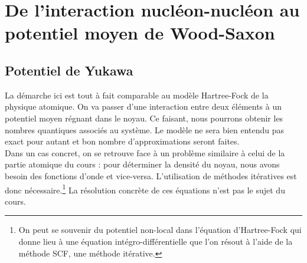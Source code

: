 \section{De l'interaction nucléon-nucléon au potentiel moyen de Wood-Saxon}
\subsection{Potentiel de Yukawa}


La démarche ici est tout à fait comparable au modèle Hartree-Fock de la physique atomique. On va passer d'une interaction entre deux éléments à un potentiel moyen régnant dans le noyau. Ce faisant, nous pourrons obtenir les nombres quantiques associés au système. Le modèle ne sera bien entendu pas exact pour autant et bon nombre d'approximations seront faites.\\

Dans un cas concret, on se retrouve face à un problème similaire à celui de la partie atomique du cours : pour déterminer la densité du noyau, nous avons besoin des fonctions d'onde et vice-versa. L'utilisation de méthodes itératives est donc nécessaire.\footnote{On peut se souvenir du potentiel non-local dans l'équation d'Hartree-Fock qui donne lieu à une équation intégro-différentielle que l'on résout à l'aide de la méthode SCF, une méthode itérative.} La résolution concrète de ces équations n'est pas le sujet du cours.\\


